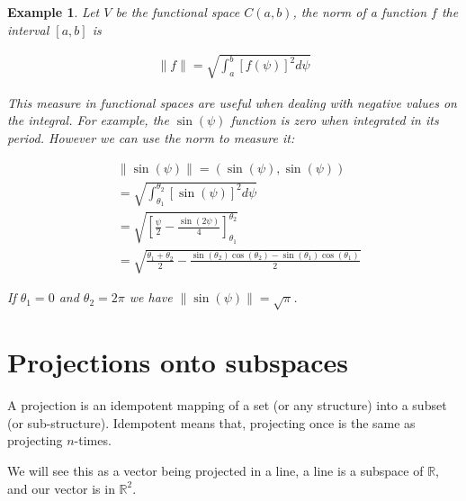 \documentclass{book}
\newtheorem{example}{Example}[chapter]
\begin{document}
\begin{example}
    Let $V$ be the functional space $C(a,b)$, the norm of a function $f$ the interval $\left[a,b\right]$ is

    \begin{equation*}
        \begin{split}
            \|f\| = \sqrt{\int_{a}^{b}{\left[f(\psi)\right]^{2}d\psi}}
        \end{split}
    \end{equation*}

    This measure in functional spaces are useful when dealing with negative values
    on the integral. For example, the $\sin (\psi)$ function is zero when
    integrated in its period. However we can use the norm to measure it:

    \begin{equation*}
        \begin{split}
            & \|\sin(\psi)\| = \left(\sin(\psi), \sin(\psi)\right)
            \\      & = \sqrt{\int_{\theta_1}^{\theta_2}{\left[\sin(\psi)\right]^{2}d\psi}}
            \\      & = \sqrt{\left[\frac{\psi}{2} - \frac{\sin\left(2\psi\right)}{4}\right]_{\theta_1}^{\theta_2}}
            \\ &= \sqrt{\frac{\theta_1 + \theta_2}{2} - \frac{\sin(\theta_2)\cos(\theta_2)-\sin(\theta_1)\cos(\theta_1)}{2}}
        \end{split}
    \end{equation*}

    If $\theta_1=0$ and $\theta_2=2\pi$ we have $\|\sin(\psi)\|=\sqrt{\pi}$.
\end{example}

\chapter{Projections onto subspaces}

A projection is an idempotent mapping of a set (or any structure) into a subset
(or sub-structure). Idempotent means that, projecting once is the same as
projecting $n$-times.

We will see this as a vector being projected in a line, a line is a subspace of
$\mathbb{R}$, and our vector is in $\mathbb{R}^{2}$.

\begin{center}
\end{center}
\end{document}
